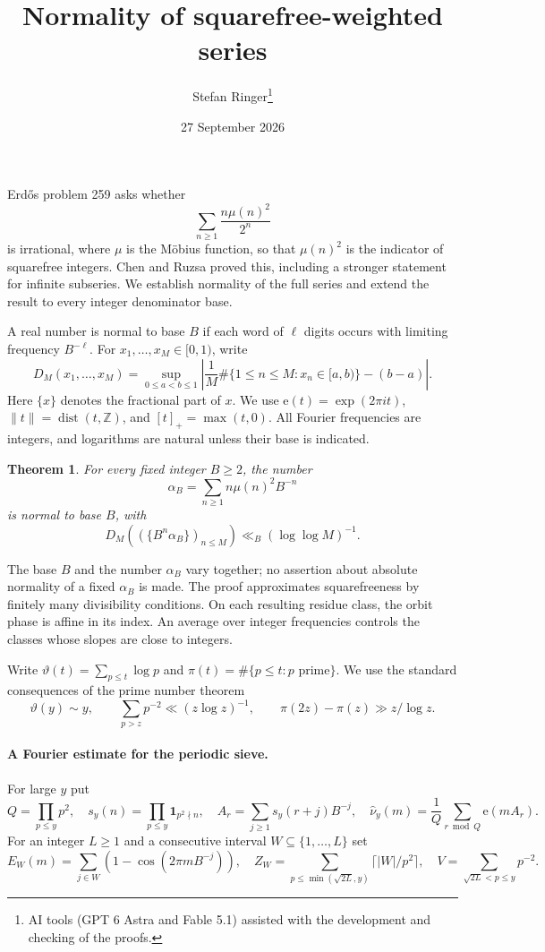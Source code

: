 \documentclass[11pt]{article}
\title{Normality of squarefree-weighted series}
\author{Stefan Ringer\thanks{AI tools (GPT 6 Astra and Fable 5.1)
assisted with the development and checking of the proofs.}}
\date{27 September 2026}
\newtheorem{theorem}{Theorem}
\newcommand{\ee}{\mathrm e}
\newcommand{\ind}{\mathbf 1}
\begin{document}
\maketitle

Erd\H{o}s problem 259 \cite{E259} asks whether
\[
                         \sum_{n\ge1}\frac{n\mu(n)^2}{2^n}
\]
is irrational, where $\mu$ is the M\"obius function, so that $\mu(n)^2$
is the indicator of squarefree integers. Chen and Ruzsa \cite{CR}
proved this, including a stronger statement for infinite subseries.
We establish normality of the full series and extend the result to every
integer denominator base.

A real number is normal to base $B$ if each word of $\ell$ digits occurs
with limiting frequency $B^{-\ell}$. For $x_1,\ldots,x_M\in[0,1)$,
write
\[
 D_M(x_1,\ldots,x_M)=
 \sup_{0\le a<b\le1}
 \left|\frac1M\#\{1\le n\le M:x_n\in[a,b)\}-(b-a)\right|.
\]
Here $\{x\}$ denotes the fractional part of $x$.
We use $\ee(t)=\exp(2\pi it)$,
$\|t\|=\operatorname{dist}(t,\mathbb Z)$, and $[t]_+=\max(t,0)$.
All Fourier frequencies are integers, and logarithms are natural
unless their base is indicated.

\begin{theorem}\label{thm}
For every fixed integer $B\ge2$, the number
\[
                    \alpha_B=\sum_{n\ge1}n\mu(n)^2B^{-n}
\]
is normal to base $B$, with
\[
                D_M((\{B^n\alpha_B\})_{n\le M})
                                      \ll_B(\log\log M)^{-1}.
\]
\end{theorem}

The base $B$ and the number $\alpha_B$ vary together; no assertion
about absolute normality of a fixed $\alpha_B$ is made.
The proof approximates squarefreeness by finitely many divisibility
conditions. On each resulting residue class, the orbit phase is affine
in its index. An average over integer frequencies controls the classes
whose slopes are close to integers.

Write $\vartheta(t)=\sum_{p\le t}\log p$ and
$\pi(t)=\#\{p\le t:p\text{ prime}\}$.
We use the standard consequences of the prime number theorem
\begin{equation}\label{prime}
 \vartheta(y)\sim y,\qquad
 \sum_{p>z}p^{-2}\ll(z\log z)^{-1},\qquad
 \pi(2z)-\pi(z)\gg z/\log z .
\end{equation}

\paragraph{A Fourier estimate for the periodic sieve.}
For large $y$ put
\[
 Q=\prod_{p\le y}p^2,\quad s_y(n)=\prod_{p\le y}\ind_{p^2\nmid n},
 \quad A_r=\sum_{j\ge1}s_y(r+j)B^{-j},\quad
 \widehat\nu_y(m)=\frac1Q\sum_{r\bmod Q}\ee(mA_r).
\]
For an integer $L\ge1$ and a consecutive interval
$W\subseteq\{1,\ldots,L\}$ set
\[
 E_W(m)=\sum_{j\in W}(1-\cos(2\pi mB^{-j})),\quad
 Z_W=\sum_{p\le\min(\sqrt{2L},y)}\lceil |W|/p^2\rceil,\quad
 V=\sum_{\sqrt{2L}<p\le y}p^{-2}.
\]
\end{document}
